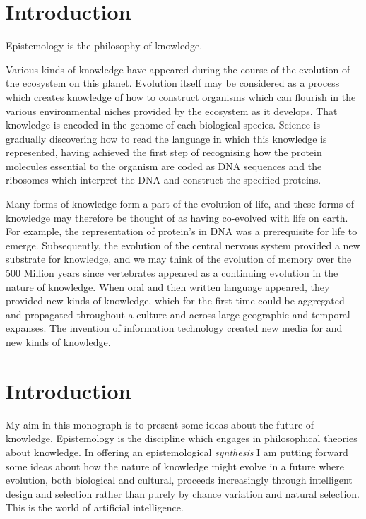 \documentclass[10pt,titlepage]{book}
\begin{document}
\chapter{Introduction}

Epistemology is the philosophy of knowledge.

Various kinds of knowledge have appeared during the course of the evolution of the ecosystem on this planet.
Evolution itself may be considered as a process which creates knowledge of how to construct organisms which can flourish in the various environmental niches provided by the ecosystem as it develops.
That knowledge is encoded in the genome of each biological species.
Science is gradually discovering how to read the language in which this knowledge is represented, having achieved the first step of recognising how the protein molecules essential to the organism are coded as DNA sequences and the ribosomes which interpret the DNA and construct the specified proteins.

Many forms of knowledge form a part of the evolution of life, and these forms of knowledge may therefore be thought of as having co-evolved with life on earth.
For example, the representation of protein's in DNA was a prerequisite for life to emerge.
Subsequently, the evolution of the central nervous system provided a new substrate for knowledge, and we may think of the evolution of memory over the 500 Million years since vertebrates appeared as a continuing evolution in the nature of knowledge.
When oral and then written language appeared, they provided new kinds of knowledge, which for the first time could be aggregated and propagated throughout a culture and across large geographic and temporal expanses.
The invention of information technology created new media for and new kinds of knowledge.


\chapter{Introduction}

My aim in this monograph is to present some ideas about the future of knowledge.
Epistemology is the discipline which engages in philosophical theories about knowledge.
In offering an epistemological \emph{synthesis} I am putting forward some ideas about how the nature of knowledge might evolve in a future where evolution, both biological and cultural, proceeds increasingly through intelligent design and selection rather than purely by chance variation and natural selection.
This is the world of artificial intelligence.
\end{document}
